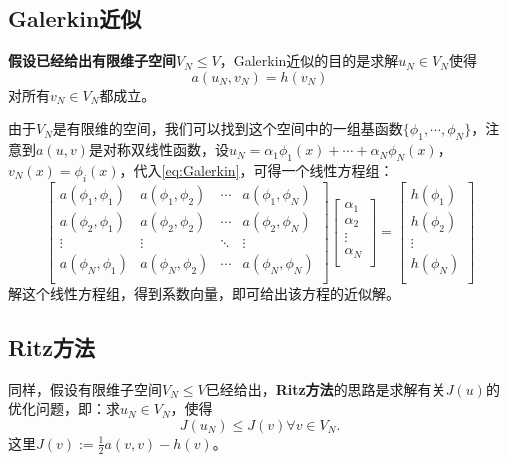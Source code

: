 \subsection{Galerkin近似}
\textbf{假设已经给出有限维子空间}$V_{N}\le V$，Galerkin近似的目的是求解$u_{N}\in V_{N}$使得
\begin{equation}
  \label{eq:Galerkin}
  a(u_{N},v_{N})=h(v_{N})
\end{equation}
对所有$v_{N}\in V_{N}$都成立。

由于$V_{N}$是有限维的空间，我们可以找到这个空间中的一组基函数$\{\phi_{1},\cdots,\phi_{N}\}$，注意到$a(u,v)$是对称双线性函数，设$u_{N}=\alpha_{1}\phi_{1}(x)+\cdots+\alpha_{N}\phi_{N}(x)$，$v_{N}(x)=\phi_{i}(x)$，代入\eqref{eq:Galerkin}，可得一个线性方程组：
\begin{equation}
  \label{eq:LinearSystem}
  \begin{bmatrix}
    a(\phi_{1},\phi_{1})&a(\phi_{1},\phi_{2})&\cdots&a(\phi_{1},\phi_{N})\\
    a(\phi_{2},\phi_{1})&a(\phi_{2},\phi_{2})&\cdots&a(\phi_{2},\phi_{N})\\
    \vdots&\vdots&\ddots&\vdots\\
    a(\phi_{N},\phi_{1})&a(\phi_{N},\phi_{2})&\cdots&a(\phi_{N},\phi_{N})\\
  \end{bmatrix}
  \begin{bmatrix}
    \alpha_{1}\\
    \alpha_{2}\\
    \vdots\\
    \alpha_{N}\\
  \end{bmatrix}
  =\begin{bmatrix}
    h(\phi_{1})\\
    h(\phi_{2})\\
    \vdots\\
    h(\phi_{N})\\
  \end{bmatrix}
\end{equation}
解这个线性方程组，得到系数向量，即可给出该方程的近似解。

\subsection{Ritz方法}
同样，假设有限维子空间$V_{N}\le V$已经给出，\textbf{Ritz方法}的思路是求解有关$J(u)$的优化问题，即：求$u_{N}\in V_{N}$，使得
\begin{equation}
J(u_{N})\le J(v)\forall v\in V_{N}.
\end{equation}
这里$J(v):=\frac{1}{2}a(v,v)-h(v)$。

